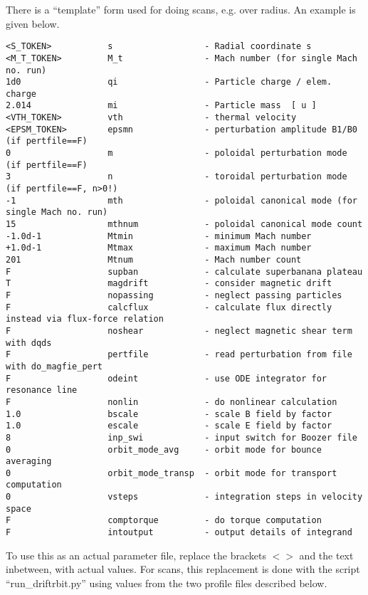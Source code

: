 There is a ``template'' form used for doing scans, e.g. over radius.
An example is given below.
\begin{verbatim}
<S_TOKEN>           s                  - Radial coordinate s
<M_T_TOKEN>         M_t                - Mach number (for single Mach no. run)
1d0                 qi                 - Particle charge / elem. charge
2.014               mi                 - Particle mass  [ u ]
<VTH_TOKEN>         vth                - thermal velocity
<EPSM_TOKEN>        epsmn              - perturbation amplitude B1/B0 (if pertfile==F)
0                   m                  - poloidal perturbation mode (if pertfile==F)
3                   n                  - toroidal perturbation mode (if pertfile==F, n>0!)
-1                  mth                - poloidal canonical mode (for single Mach no. run)
15                  mthnum             - poloidal canonical mode count
-1.0d-1             Mtmin              - minimum Mach number
+1.0d-1             Mtmax              - maximum Mach number
201                 Mtnum              - Mach number count
F                   supban             - calculate superbanana plateau
T                   magdrift           - consider magnetic drift
F                   nopassing          - neglect passing particles
F                   calcflux           - calculate flux directly instead via flux-force relation
F                   noshear            - neglect magnetic shear term with dqds
F                   pertfile           - read perturbation from file with do_magfie_pert
F                   odeint             - use ODE integrator for resonance line
F                   nonlin             - do nonlinear calculation
1.0                 bscale             - scale B field by factor
1.0                 escale             - scale E field by factor
8                   inp_swi            - input switch for Boozer file
0                   orbit_mode_avg     - orbit mode for bounce averaging
0                   orbit_mode_transp  - orbit mode for transport computation
0                   vsteps             - integration steps in velocity space
F                   comptorque         - do torque computation
F                   intoutput          - output details of integrand
\end{verbatim}
To use this as an actual parameter file, replace the brackets $<>$ and
the text inbetween, with actual values.
For scans, this replacement is done with the script ``run_driftrbit.py''
using values from the two profile files described below.

